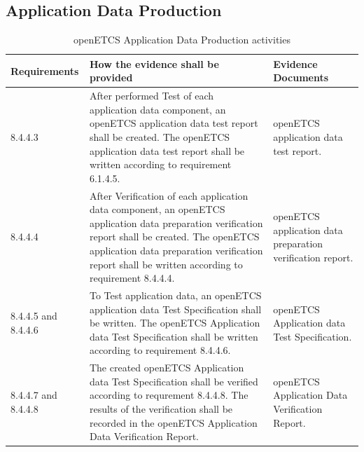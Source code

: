 \documentclass{template/openetcs_report}
\begin{document}
\subsection{Application Data Production}
{\footnotesize\sffamily\centering
\begin{longtable}{|p{2cm}|p{9cm}|p{3cm}|}
\caption{openETCS Application Data Production activities}\\
\hline
\bfseries Requirements & \bfseries How the evidence shall be provided & \bfseries Evidence Documents\\
\hline
\hline
\endhead
\hline
\endfoot

8.4.4.3 & After performed Test of each application data component, an openETCS application data test report shall be created.
The openETCS application data test report shall be written according to requirement 6.1.4.5. & openETCS application data test report.\\ 
\hline
8.4.4.4 & After Verification of each application data component, an openETCS application data preparation verification report shall be created.
The openETCS application data preparation verification report shall be written according to requirement 8.4.4.4. & openETCS application data preparation verification report.\\ 
\hline
8.4.4.5 and 8.4.4.6 & To Test application data, an openETCS application data Test Specification shall be written.
The openETCS Application data Test Specification shall be written according to requirement 8.4.4.6. & openETCS Application data Test Specification.\\ 
\hline
8.4.4.7 and 8.4.4.8 & The created openETCS Application data Test Specification shall be verified according to requrement 8.4.4.8.
The results of the verification shall be recorded in the openETCS Application Data Verification Report. & openETCS Application Data Verification Report.\\ 
\hline
\end{longtable}}
\end{document}
